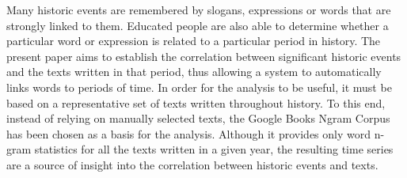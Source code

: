 
Many historic events are remembered by slogans, expressions or words that are strongly linked to them. Educated people are also able to determine whether a particular word or expression is related to a particular period in history. The present paper aims to establish the correlation between significant historic events and the texts written in that period, thus allowing a system to automatically links words to periods of time. In order for the analysis to be useful, it must be based on a representative set of texts written throughout history. To this end, instead of relying on manually selected texts, the Google Books Ngram Corpus has been chosen as a basis for the analysis. Although it provides only word n-gram statistics for all the texts written in a given year, the resulting time series are a source of insight into the correlation between historic events and texts.
